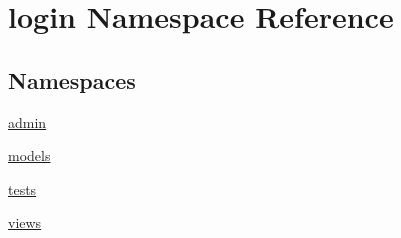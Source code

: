 \hypertarget{namespacelogin}{\section{login Namespace Reference}
\label{namespacelogin}
}
\subsection*{Namespaces}
\begin{DoxyCompactItemize}
\item 
\hyperlink{namespacelogin_1_1admin}{admin}
\item 
\hyperlink{namespacelogin_1_1models}{models}
\item 
\hyperlink{namespacelogin_1_1tests}{tests}
\item 
\hyperlink{namespacelogin_1_1views}{views}
\end{DoxyCompactItemize}
